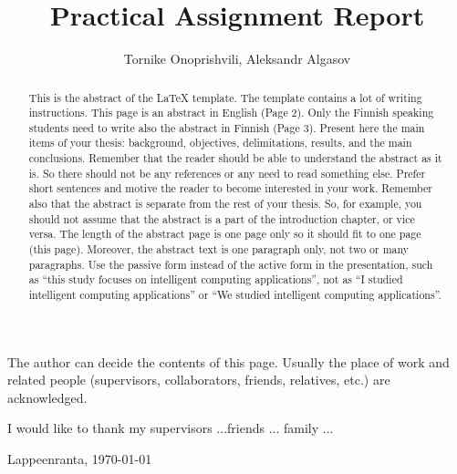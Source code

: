 \documentclass{lutmscthesis}[2017/10/03]
\title{Practical Assignment Report}
\author{Tornike Onoprishvili, Aleksandr Algasov}
\begin{document}

\maketitle
\newpage

\begin{abstract}

This is the abstract of the LaTeX template. The template contains a lot of writing instructions. 
This page is an abstract in English (Page 2).
Only the Finnish speaking students need to write also the abstract in Finnish (Page 3).
Present here the main items of your thesis: background, objectives, delimitations, results, and the main conclusions. 
Remember that the reader should be able to understand the abstract as it is. 
So there should not be any references or any need to read something else. 
Prefer short sentences and motive the reader to become interested in your work. 
Remember also that the abstract is separate from the rest of your thesis. 
So, for example, you should not assume that the abstract is a part of the introduction chapter, or vice versa.
The length of the abstract page is one page only so it should fit to one page (this page).
Moreover, the abstract text is one paragraph only, not two or many paragraphs. 
Use the passive form instead of the active form in the presentation, such as “this study focuses on intelligent computing applications”, not as “I studied intelligent computing applications” or “We studied intelligent computing applications”.

\end{abstract}


\begin{preface}

The author can decide the contents of this page. Usually the place of work and related people (supervisors, collaborators, friends, relatives, etc.) are acknowledged.

I would like to thank my supervisors ...friends ... family ...

Lappeenranta, \today

\end{preface}



\renewcommand\refname{REFERENCES}
\renewcommand\contentsname{CONTENTS}

\pagestyle{masters}
\newpage


\end{document}
